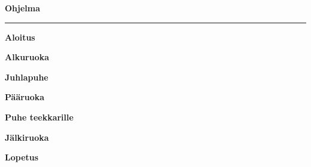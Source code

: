 \centering

\textbf{\Large Ohjelma}

\rule{5cm}{0.5mm}
\vspace{6mm}

\textbf{\large Aloitus} \vspace{5mm}

\textbf{\large Alkuruoka} \vspace{5mm}

\textbf{\large Juhlapuhe} \vspace{5mm}

\textbf{\large Pääruoka} \vspace{5mm}

\textbf{\large Puhe teekkarille} \vspace{5mm}

\textbf{\large Jälkiruoka} \vspace{5mm}

\textbf{\large Lopetus}

\RaggedRight